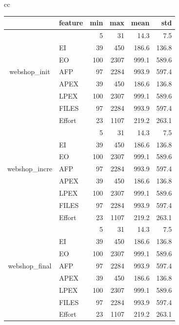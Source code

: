 \documentclass[sigconf,review]{acmart}
\begin{document}
\begin{table}[t!]
{\begin{tabular}{cc}
\scriptsize
\begin{tabular}{|c|l|rrrr|}
    \hline
      & feature
    & min  & max & mean & std\\
  \hline
\multirow{7}{*}{\begin{sideways}webshop\_init\end{sideways}}
& \IT{LOC} & 5 & 31 & 14.3 & 7.5\\
& EI & 39 & 450 & 186.6 & 136.8\\
& EO & 100 & 2307 & 999.1 & 589.6\\
& AFP & 97 & 2284 & 993.9 & 597.4\\
& APEX & 39 & 450 & 186.6 & 136.8\\
& LPEX & 100 & 2307 & 999.1 & 589.6\\
& FILES & 97 & 2284 & 993.9 & 597.4\\
& Effort & 23 & 1107 & 219.2 & 263.1\\
\hline
\multirow{7}{*}{\begin{sideways}webshop\_incre\end{sideways}}
& \IT{LOC} & 5 & 31 & 14.3 & 7.5\\
& EI & 39 & 450 & 186.6 & 136.8\\
& EO & 100 & 2307 & 999.1 & 589.6\\
& AFP & 97 & 2284 & 993.9 & 597.4\\
& APEX & 39 & 450 & 186.6 & 136.8\\
& LPEX & 100 & 2307 & 999.1 & 589.6\\
& FILES & 97 & 2284 & 993.9 & 597.4\\
& Effort & 23 & 1107 & 219.2 & 263.1\\
\hline
\multirow{7}{*}{\begin{sideways}webshop\_final\end{sideways}}
& \IT{LOC} & 5 & 31 & 14.3 & 7.5\\
& EI & 39 & 450 & 186.6 & 136.8\\
& EO & 100 & 2307 & 999.1 & 589.6\\
& AFP & 97 & 2284 & 993.9 & 597.4\\
& APEX & 39 & 450 & 186.6 & 136.8\\
& LPEX & 100 & 2307 & 999.1 & 589.6\\
& FILES & 97 & 2284 & 993.9 & 597.4\\
& Effort & 23 & 1107 & 219.2 & 263.1\\
\hline
\end{tabular} 
\end{tabular}
}
\end{table}
\end{document}
